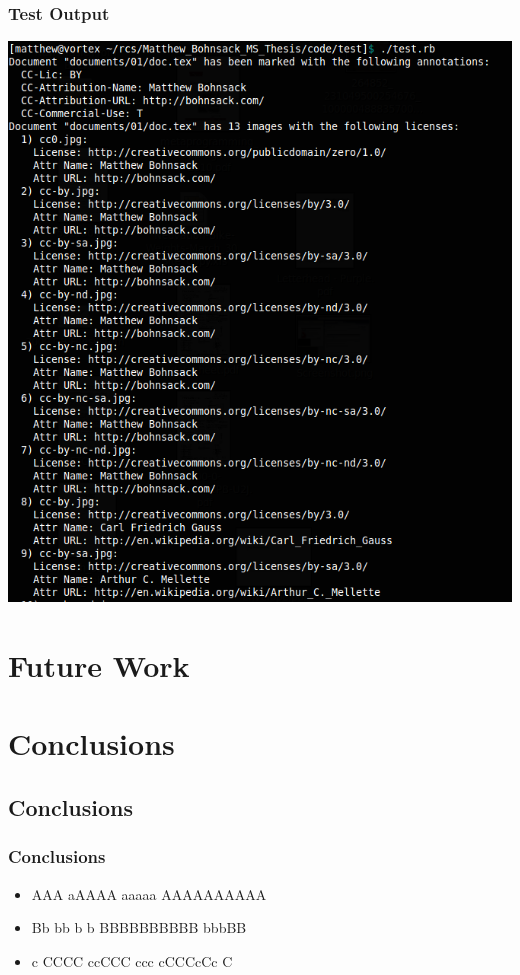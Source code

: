 \documentclass[mathserif,xcolor=dvipsnames,handout]{beamer}
\begin{document}
    \begin{frame}[t]
        \frametitle{Test Output}
        \begin{center}
            \includegraphics[height=0.85\textheight]{test-output.png}
        \end{center}
    \end{frame}

\section{Future Work}

\section{Conclusions}
    \subsection{Conclusions}
    \begin{frame}[t]
        \frametitle{Conclusions}
        \begin{itemize}
            \item<2-> AAA aAAAA aaaaa AAAAAAAAAA
            \item<3-> Bb bb b b BBBBBBBBBB bbbBB
            \item<4-> c CCCC ccCCC ccc cCCCcCc C
        \end{itemize}
    \end{frame}
\end{document}

